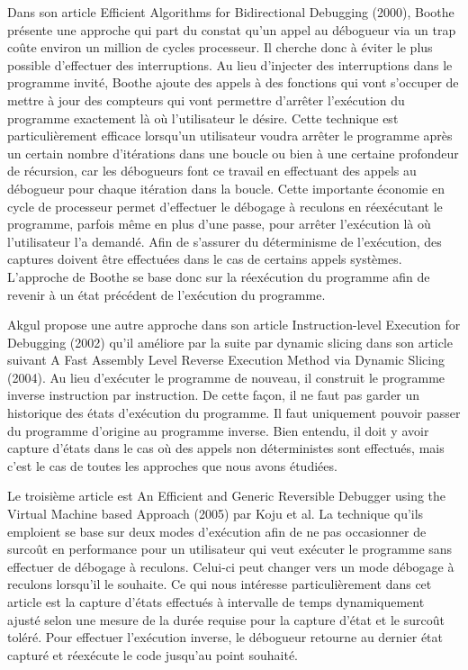 \documentclass{article}
\begin{document}
Dans son article Efficient Algorithms for Bidirectional Debugging
(2000)\cite{Boothe-2000}, Boothe présente une approche qui part du constat qu'un appel au
débogueur via un trap coûte environ un million de cycles processeur. Il
cherche donc à éviter le plus possible d'effectuer des interruptions. Au
lieu d'injecter des interruptions dans le programme invité, Boothe
ajoute des appels à des fonctions qui vont s'occuper de mettre à jour
des compteurs qui vont permettre d'arrêter l'exécution du programme
exactement là où l'utilisateur le désire. Cette technique est
particulièrement efficace lorsqu'un utilisateur voudra arrêter le
programme après un certain nombre d'itérations dans une boucle ou bien à
une certaine profondeur de récursion, car les débogueurs font ce travail
en effectuant des appels au débogueur pour chaque itération dans la
boucle. Cette importante économie en cycle de processeur permet
d'effectuer le débogage à reculons en réexécutant le programme, parfois
même en plus d'une passe, pour arrêter l'exécution là où l'utilisateur
l'a demandé. Afin de s'assurer du déterminisme de l'exécution, des
captures doivent être effectuées dans le cas de certains appels
systèmes. L'approche de Boothe se base donc sur la réexécution du
programme afin de revenir à un état précédent de l'exécution du
programme.

Akgul propose une autre approche dans son article Instruction-level
Execution for Debugging (2002)\cite{Akgul-2002} qu'il améliore par la suite par dynamic
slicing dans son article suivant A Fast Assembly Level Reverse Execution
Method via Dynamic Slicing (2004). Au lieu d'exécuter le programme de
nouveau, il construit le programme inverse instruction par instruction.
De cette façon, il ne faut pas garder un historique des états
d'exécution du programme. Il faut uniquement pouvoir passer du programme
d'origine au programme inverse. Bien entendu, il doit y avoir capture
d'états dans le cas où des appels non déterministes sont effectués, mais
c'est le cas de toutes les approches que nous avons étudiées.

Le troisième article est An Efficient and Generic Reversible Debugger
using the Virtual Machine based Approach (2005) par Koju et al\cite{Koju-2005}. La
technique qu'ils emploient se base sur deux modes d'exécution afin de ne
pas occasionner de surcoût en performance pour un utilisateur qui veut
exécuter le programme sans effectuer de débogage à reculons. Celui-ci peut changer
vers un mode débogage à reculons lorsqu'il le souhaite. Ce qui nous intéresse
particulièrement dans cet article est la capture d'états effectués à
intervalle de temps dynamiquement ajusté selon une mesure de la durée
requise pour la capture d'état et le surcoût toléré. Pour effectuer
l'exécution inverse, le débogueur retourne au dernier état capturé et
réexécute le code jusqu'au point souhaité.
\end{document}
